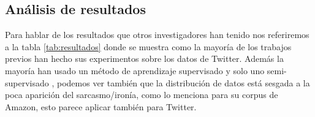 % 		

\subsection{Análisis de resultados}

\par Para hablar de los resultados que otros investigadores han tenido nos referiremos a la tabla \ref{tab:resultados} donde se muestra como la mayoría de los trabajos previos han hecho sus experimentos sobre los datos de Twitter. Además la mayoría han usado un método de aprendizaje supervisado y solo uno semi-supervisado \cite{davidov2010semi}, podemos ver también que la distribución de datos está sesgada a la poca aparición del sarcasmo/ironía, como lo menciona \cite{liu2007low} para su corpus de Amazon, esto parece aplicar también para Twitter.


